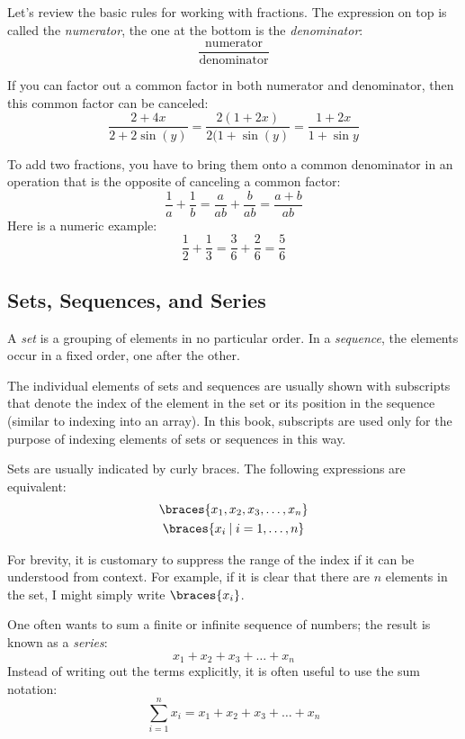 
Let's review the basic rules for working with fractions. The
expression on top is called the \emph{numerator}, the one at the
bottom is the \emph{denominator}:
%
\[
\frac{\text{numerator}}{\text{denominator}}
\]
%

If you can factor out a common factor in both numerator and
denominator, then this common factor can be canceled:
%
\[
\frac{2 + 4x}{2 + 2\sin(y)} 
= \frac{2 (1+2x)}{2(1+\sin(y)} = \frac{ 1 + 2 x }{ 1 + \sin y} 
\]
%

To add two fractions, you have to bring them onto a common denominator
in an operation that is the opposite of canceling a common factor:
%
\[
\frac{1}{a} + \frac{1}{b} = \frac{a}{ab} + \frac{b}{ab} = \frac{a+b}{ab}
\]
%
Here is a numeric example:
%
\[
\frac{1}{2} + \frac{1}{3} = \frac{3}{6} + \frac{2}{6} = \frac{5}{6}
\]
%

\subsection{Sets, Sequences, and Series}


A \emph{set} is a grouping of elements in no particular order.  In a
\emph{sequence}, the elements occur in a fixed order, one after the
other.

The individual elements of sets and sequences are usually shown with
subscripts that denote the index of the element in the set or its
position in the sequence (similar to indexing into an array). In this
book, subscripts are used only for the purpose of indexing elements of
sets or sequences in this way.

Sets are usually indicated by curly braces. The following expressions
are equivalent:
\begin{gather*}
\braces{ x_1, x_2, x_3, \dots, x_n } \\
\braces{ x_i \: | \; i = 1, \dots, n }
\end{gather*}

For brevity, it is customary to suppress the range of the index if it
can be understood from context. For example, if it is clear that there
are $n$ elements in the set, I might simply write $\braces{x_i}$.

One often wants to sum a finite or infinite sequence of numbers; the
result is known as a \emph{series}:
%
\[
x_1 + x_2 + x_3 + \dots + x_n
\]
%
Instead of writing out the terms explicitly, it is often useful to
use the sum notation:
%
\[
\sum_{i=1}^n x_i = x_1 + x_2 + x_3 + \dots + x_n
\]
%

